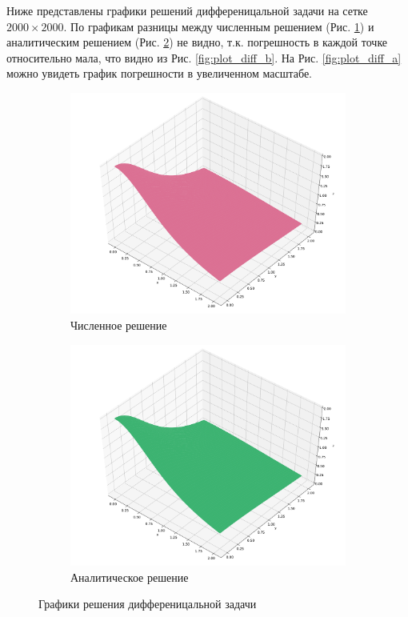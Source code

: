 \documentclass[12pt, a4paper]{article}
\begin{document}
        Ниже представлены графики решений дифференицальной задачи на сетке $2000 \times 2000$. По графикам разницы между численным решением (Рис. \ref{fig:plot_a}) и аналитическим решением (Рис. \ref{fig:plot_b}) не видно, т.к. погрешность в каждой точке относительно мала, что видно из Рис. \ref{fig:plot_diff_b}. На Рис. \ref{fig:plot_diff_a} можно увидеть график погрешности в увеличенном масштабе.
        \begin{figure}[H]
            \centering
            \begin{subfigure}[b]{0.49\textwidth}
                \centering
                \includegraphics[width=\textwidth]{pics/cg.pdf}
                \caption{Численное решение}
                \label{fig:plot_a}
            \end{subfigure}
            \begin{subfigure}[b]{0.49\textwidth}
                \centering
                \includegraphics[width=\textwidth]{pics/real.pdf}
                \caption{Аналитическое решение}
                \label{fig:plot_b}
            \end{subfigure}
            \caption{Графики решения дифференицальной задачи}
            \label{fig:plot}
        \end{figure}
\end{document}
